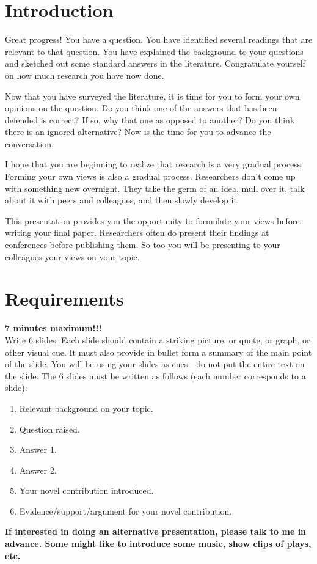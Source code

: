 \documentclass[oneside]{article}
\begin{document}
\section*{Introduction}\label{introduction}

Great progress! You have a question. You have identified several
readings that are relevant to that question. You have explained the
background to your questions and sketched out some standard answers in
the literature. Congratulate yourself on how much research you have now
done.

Now that you have surveyed the literature, it is time for you to form
your own opinions on the question. Do you think one of the answers that
has been defended is correct? If so, why that one as opposed to another?
Do you think there is an ignored alternative? Now is the time for you to
advance the conversation.

I hope that you are beginning to realize that research is a very gradual
process. Forming your own views is also a gradual process. Researchers
don't come up with something new overnight. They take the germ of an
idea, mull over it, talk about it with peers and colleagues, and then slowly
develop it.

This presentation provides you the opportunity to formulate your views
before writing your final paper. Researchers often do present their
findings at conferences before publishing them. So too you will be
presenting to your colleagues your views on your topic.


\section*{Requirements}\label{requirements}

\noindent \textbf{7 minutes maximum!!!}\\

\noindent Write 6 slides. Each slide should contain a striking picture, or quote,
or graph, or other visual cue. It must also provide in bullet form a
summary of the main point of the slide. You will be using your slides as
cues---do not put the entire text on the slide. The 6 slides must be
written as follows (each number corresponds to a slide):

\begin{enumerate}
\item
  Relevant background on your topic.
\item
  Question raised.
\item
  Answer 1.
\item
  Answer 2.
\item
  Your novel contribution introduced.
\item
  Evidence/support/argument for your novel contribution.
\end{enumerate}

\noindent \textbf{If interested in doing an alternative presentation, please talk to me in advance. Some might like to introduce some music, show clips of plays, etc.}
\end{document}
